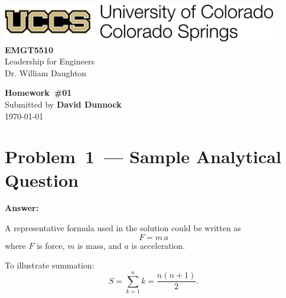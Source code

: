 \documentclass[12pt]{article}
\newenvironment{problem}{\color{dodblue}\itshape}{\par}
\newcommand{\homeworknum}{01}  %
\begin{document}
\begin{center}
    \includegraphics[width=0.9\textwidth,keepaspectratio]{uccs-logo.png}\\[8\baselineskip]

    {\HeadingFont\fontsize{24}{26}\selectfont\textbf{EMGT5510}}\\[0.25\baselineskip]
    {\large Leadership for Engineers}\\[0.15\baselineskip]
    {\small Dr. William Daughton}\\[2\baselineskip]
\vfill

    {\HeadingFont\fontsize{20}{22}\selectfont\textbf{Homework~\#\homeworknum}}\\[0.5\baselineskip]
    {Submitted by \textbf{David Dunnock}}\\[0.15\baselineskip]
    {\today}
\end{center}

\newpage

\section*{Problem 1 –– Sample Analytical Question}
\begin{problem}
\lipsum[1]
\end{problem}

\textbf{Answer:}\\
\lipsum[2]

A representative formula used in the solution could be written as
\begin{equation}\label{eq:newton}
F = m\,a
\end{equation}
where $F$ is force, $m$ is mass, and $a$ is acceleration.

To illustrate summation:
\begin{equation}
S = \sum_{k=1}^{n} k = \frac{n(n+1)}{2}.
\end{equation}

\end{document}
